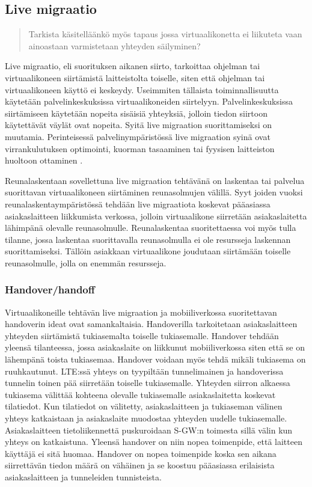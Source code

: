 \subsection{Live migraatio} \label{livemigraatio}
\begin{quotation}
Tarkista käsitelläänkö myös tapaus jossa virtuaalikonetta ei liikuteta vaan ainoastaan varmistetaan yhteyden säilyminen?
\end{quotation}
Live migraatio, eli suorituksen aikanen siirto, tarkoittaa ohjelman tai virtuaalikoneen siirtämistä laitteistolta toiselle, siten että ohjelman tai virtuaalikoneen käyttö ei keskeydy. 
Useimmiten tällaista toiminnallisuutta käytetään palvelinkeskuksissa virtuaalikoneiden
siirtelyyn. Palvelinkeskuksissa siirtämiseen käytetään nopeita sisäisiä yhteyksiä,
jolloin tiedon siirtoon käytettävät väylät ovat nopeita. Syitä live migraation
suorittamiseksi on muutamia. Perinteisessä palvelinympäristössä live migraation
syinä ovat virrankulutuksen optimointi, kuorman tasaaminen tai fyysisen
laitteiston huoltoon ottaminen \cite{soni2013comparative}. 

Reunalaskentaan sovellettuna live migraation tehtävänä on laskentaa tai palvelua suorittavan virtuaalikoneen siirtäminen reunasolmujen välillä.
Syyt joiden vuoksi reunalaskentaympäristössä tehdään live migraatiota koskevat pääasiassa asiakaslaitteen liikkumista verkossa, jolloin virtuaalikone siirretään asiakaslaitetta lähimpänä olevalle  reunasolmulle. 
Reunalaskentaa suoritettaessa voi myös tulla tilanne, jossa laskentaa suorittavalla reunasolmulla ei ole resursseja laskennan suorittamiseksi. Tällöin asiakkaan virtuaalikone joudutaan siirtämään toiselle reunasolmulle, jolla on enemmän resursseja.  


\subsubsection*{Handover/handoff}%
Virtuaalikoneille tehtävän live migraation ja mobiiliverkossa suoritettavan handoverin ideat ovat samankaltaisia.
Handoverilla tarkoitetaan asiakaslaitteen yhteyden siirtämistä tukiasemalta toiselle tukiasemalle. 
Handover tehdään yleensä tilanteessa, jossa asiakaslaite on liikkunut mobiiliverkossa siten että se on lähempänä toista tukiasemaa. Handover voidaan myös tehdä mikäli tukiasema on ruuhkautunut. \cite{lähde}
LTE:ssä yhteys on tyypiltään tunnelimainen ja handoverissa tunnelin toinen pää siirretään toiselle tukiasemalle.
Yhteyden siirron alkaessa tukiasema välittää kohteena olevalle tukiasemalle asiakaslaitetta koskevat tilatiedot. Kun tilatiedot on välitetty, asiakaslaitteen ja tukiaseman välinen yhteys katkaistaan ja asiakaslaite muodostaa yhteyden uudelle tukiasemalle.
Asiakaslaitteen tietoliikennettä puskuroidaan S-GW:n toimesta sillä välin kun yhteys on katkaistuna. Yleensä handover on niin nopea toimenpide, että laitteen käyttäjä ei sitä huomaa.
Handover on nopea toimenpide koska sen aikana siirrettävän tiedon määrä on vähäinen ja se koostuu pääasiassa erilaisista asiakaslaitteen ja tunneleiden tunnisteista.


